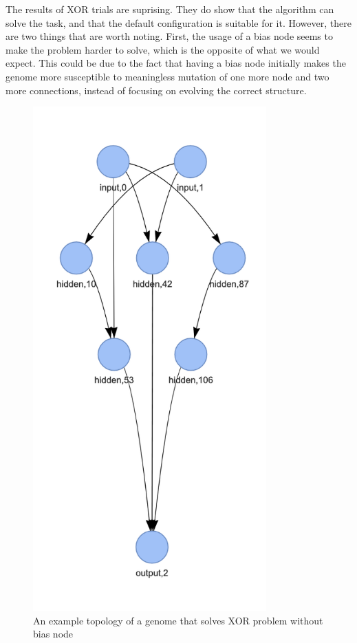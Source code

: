 \documentclass{article}
\begin{document}
    The results of XOR trials are suprising. They do show that the algorithm can solve the task, and that the default configuration is suitable for it.
    However, there are two things that are worth noting. First, the usage of a bias node seems to make the problem harder to solve, 
    which is the opposite of what we would expect. This could be due to the fact that having a bias node initially 
    makes the genome more susceptible to meaningless mutation of one more node and two more connections,
    instead of focusing on evolving the correct structure.
    \begin{figure}
        \centering
        \includegraphics[width=0.8\textwidth]{xor_topology_example.png}
        \caption{An example topology of a genome that solves XOR problem without bias node }
        \label{fig:xor_bias}
    \end{figure}
\end{document}
